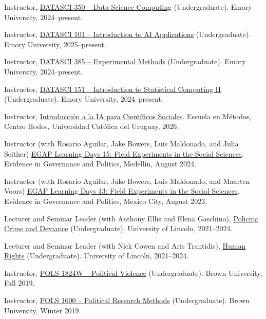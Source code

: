 \documentclass[a4paper]{article}
\renewenvironment{itemize}{
	\begin{list}{}{
			\setlength{\leftmargin}{1.5em}
		}
		}{
	\end{list}
}
\begin{document}
\begin{itemize}
\item Instructor, \href{https://danilofreire.github.io/datasci350/}{DATASCI 350 -- Data Science Computing} (Undergraduate). Emory University, 2024--present.
\item Instructor, \href{https://danilofreire.github.io/datasci101/}{DATASCI 101 -- Introduction to AI Applications} (Undergraduate). Emory University, 2025--present.
\item Instructor, \href{https://danilofreire.github.io/datasci385/}{DATASCI 385 -- Experimental Methods} (Undergraduate). Emory University, 2024--present.
\item Instructor, \href{https://danilofreire.github.io/datasci151/}{DATASCI 151 -- Introduction to Statistical Computing II} (Undergraduate). Emory University, 2024--present.
\item Instructor, \href{https://danilofreire.github.io/introduccion-ia-ucu/}{Introducci\'{o}n a la IA para Cient\'{i}ficos Sociales}. Escuela en M\'{e}todos, Centro Hodos, Universidad Cat\'{o}lica del Uruguay, 2026.
\item Instructor (with Rosario Aguilar, Jake Bowers, Luis Maldonado, and Julia Seither) \href{https://egap.org/project/learning-days-15-latin-america-regional-hub-workshop/}{EGAP Learning Days 15: Field Experiments in the Social Sciences}. Evidence in Governance and Politics, Medellín, August 2024.
\item Instructor (with Rosario Aguilar, Jake Bowers, Luis Maldonado, and Maarten Voors) \href{https://egap.org/project/learning-days-13-latin-america-regional-hub-workshop/}{EGAP Learning Days 13: Field Experiments in the Social Sciences}. Evidence in Governance and Politics, Mexico City, August 2023.
\item Lecturer and Seminar Leader (with Anthony Ellis and Elena Gaschino), \href{https://blackboard.lincoln.ac.uk/ultra/courses/_182116_1/cl/outline}{Policing Crime and Deviance} (Undergraduate). University of Lincoln, 2021--2024.
\item Lecturer and Seminar Leader (with Nick Cowen and Aris Trantidis), \href{https://blackboard.lincoln.ac.uk/ultra/courses/_184943_1/cl/outline}{Human Rights} (Undergraduate). University of Lincoln, 2021--2024.
\item Instructor, \href{https://danilofreire.github.io/pols1824w/}{POLS 1824W -- Political Violence} (Undergraduate). Brown University, Fall 2019.
\item Instructor, \href{https://pols1600.github.io/}{POLS 1600 -- Political Research Methods} (Undergraduate). Brown University, Winter 2019.

\end{itemize}
\end{document}
